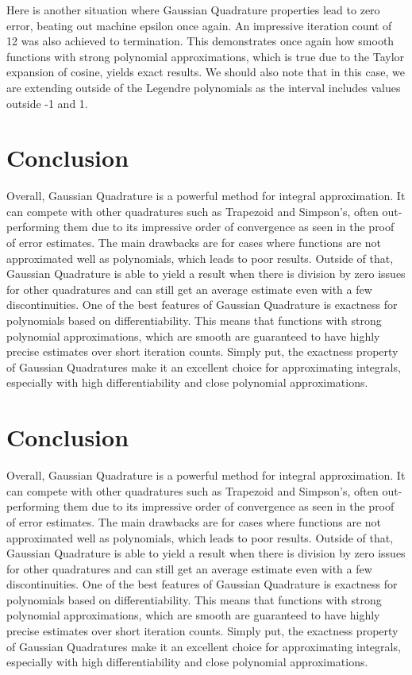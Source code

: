 \documentclass[12pt]{article}
\begin{document}
Here is another situation where Gaussian Quadrature properties lead to zero error, beating out machine epsilon once again. An impressive iteration count of 12 was also achieved to termination. This demonstrates once again how smooth functions with strong polynomial approximations, which is true due to the Taylor expansion of cosine, yields exact results. We should also note that in this case, we are extending outside of the Legendre polynomials as the interval includes values outside -1 and 1.

\section{Conclusion}

Overall, Gaussian Quadrature is a powerful method for integral approximation. It can compete with other quadratures such as Trapezoid and Simpson's, often out-performing them due to its impressive order of convergence as seen in the proof of error estimates. The main drawbacks are for cases where functions are not approximated well as polynomials, which leads to poor results. Outside of that, Gaussian Quadrature is able to yield a result when there is division by zero issues for other quadratures and can still get an average estimate even with a few discontinuities. One of the best features of Gaussian Quadrature is exactness for polynomials based on differentiability. This means that functions with strong polynomial approximations, which are smooth are guaranteed to have highly precise estimates over short iteration counts. Simply put, the exactness property of Gaussian Quadratures make it an excellent choice for approximating integrals, especially with high differentiability and close polynomial approximations.




\section{Conclusion}

Overall, Gaussian Quadrature is a powerful method for integral approximation. It can compete with other quadratures such as Trapezoid and Simpson's, often out-performing them due to its impressive order of convergence as seen in the proof of error estimates. The main drawbacks are for cases where functions are not approximated well as polynomials, which leads to poor results. Outside of that, Gaussian Quadrature is able to yield a result when there is division by zero issues for other quadratures and can still get an average estimate even with a few discontinuities. One of the best features of Gaussian Quadrature is exactness for polynomials based on differentiability. This means that functions with strong polynomial approximations, which are smooth are guaranteed to have highly precise estimates over short iteration counts. Simply put, the exactness property of Gaussian Quadratures make it an excellent choice for approximating integrals, especially with high differentiability and close polynomial approximations.
\end{document}
